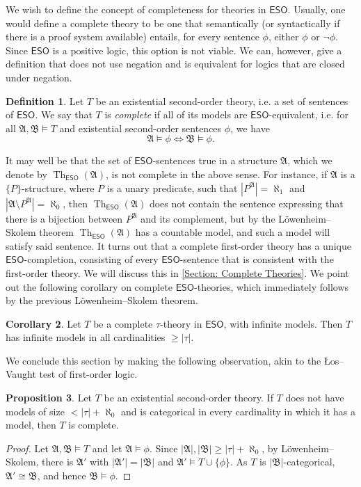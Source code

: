 \documentclass[a4paper]{amsart}
\theoremstyle{definition}
\newtheorem{definition}{Definition}[section]
\newtheorem{proposition}[definition]{Proposition}
\newtheorem{corollary}[definition]{Corollary}
\theoremstyle{remark}
\newcommand{\A}{\mathcal{A}}
\newcommand{\B}{\mathcal{B}}
\newcommand\eso{\mathsf{ESO}}
\theoremstyle{definition}
\renewcommand{\A}{\mathfrak{A}}
\renewcommand{\B}{\mathfrak{B}}
\DeclareMathOperator{\Th}{Th}
\newcommand{\ESOTh}{\Th_{\eso}}
\begin{document}
We wish to define the concept of completeness for theories in $\eso$. Usually, one would define a complete theory to be one that semantically (or syntactically if there is a proof system available) entails, for every sentence $\phi$, either $\phi$ or $\neg\phi$. Since $\eso$ is a positive logic, this option is not viable. We can, however, give a definition that does not use negation and is equivalent for logics that are closed under negation.

\begin{definition}\label{definition: complete eso theory}
    Let $T$ be an existential second-order theory, i.e. a set of sentences of $\eso$. We say that $T$ is \emph{complete} if all of its models are $\eso$-equivalent, i.e. for all $\A,\B\models T$ and existential second-order sentences $\phi$, we have
    \[
        \A\models\phi \iff \B\models\phi.
    \]
\end{definition}

It may well be that the set of $\eso$-sentences true in a structure $\A$, which we denote by $\ESOTh(\A)$, is not complete in the above sense. For instance, if $\A$ is a $\{P\}$-structure, where $P$ is a unary predicate, such that $|P^\A| = \aleph_1$ and $|\A\setminus P^\A| = \aleph_0$, then $\ESOTh(\A)$ does not contain the sentence expressing that there is a bijection between $P^\A$ and its complement, but by the Löwenheim--Skolem theorem $\ESOTh(\A)$ has a countable model, and such a model will satisfy said sentence. It turns out that a complete first-order theory has a unique $\eso$-completion, consisting of every $\eso$-sentence that is consistent with the first-order theory. We will discuss this in \cref{Section: Complete Theories}. We  point out the following corollary on complete $\eso$-theories, which immediately follows by the previous Löwenheim--Skolem theorem.

\begin{corollary}
    Let $T$ be a complete $\tau$-theory in $\eso$, with infinite models. Then $T$ has infinite models in all cardinalities $\geq|\tau|$.
\end{corollary}

We conclude this section by making the following observation, akin to the Łos--Vaught test of first-order logic.

\begin{proposition}
    Let $T$ be an existential second-order theory. If $T$ does not have models of size $<|\tau|+\aleph_0$ and is categorical in every cardinality in which it has a model, then $T$ is complete.
\end{proposition}
\begin{proof}
    Let $\A,\B\models T$ and let $\A\models\phi$. Since $|\A|,|\B|\geq|\tau|+\aleph_0$, by Löwenheim--Skolem, there is $\A'$ with $|\A'|=|\B|$ and $\A'\models T\cup\{\phi\}$. As $T$ is $|\B|$-categorical, $\A'\cong\B$, and hence $\B\models\phi$.
\end{proof}
\end{document}
